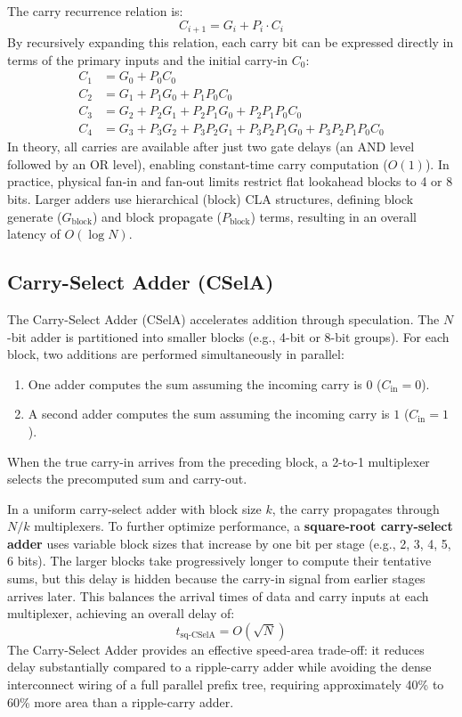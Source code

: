 The carry recurrence relation is:
\begin{equation}
C_{i+1} = G_i + P_i \cdot C_i
\end{equation}
By recursively expanding this relation, each carry bit can be expressed directly in terms of the primary inputs and the initial carry-in $C_0$:
\begin{align}
C_1 &= G_0 + P_0 C_0 \\
C_2 &= G_1 + P_1 G_0 + P_1 P_0 C_0 \\
C_3 &= G_2 + P_2 G_1 + P_2 P_1 G_0 + P_2 P_1 P_0 C_0 \\
C_4 &= G_3 + P_3 G_2 + P_3 P_2 G_1 + P_3 P_2 P_1 G_0 + P_3 P_2 P_1 P_0 C_0
\end{align}
In theory, all carries are available after just two gate delays (an AND level followed by an OR level), enabling constant-time carry computation ($O(1)$). In practice, physical fan-in and fan-out limits restrict flat lookahead blocks to 4 or 8 bits. Larger adders use hierarchical (block) CLA structures, defining block generate ($G_{\text{block}}$) and block propagate ($P_{\text{block}}$) terms, resulting in an overall latency of $O(\log N)$.

\subsection{Carry-Select Adder (CSelA)}
The Carry-Select Adder (CSelA) \cite{bedrij1962} accelerates addition through speculation. The $N$-bit adder is partitioned into smaller blocks (e.g., 4-bit or 8-bit groups). For each block, two additions are performed simultaneously in parallel:
\begin{enumerate}
    \item One adder computes the sum assuming the incoming carry is $0$ ($C_{\text{in}} = 0$).
    \item A second adder computes the sum assuming the incoming carry is $1$ ($C_{\text{in}} = 1$).
\end{enumerate}
When the true carry-in arrives from the preceding block, a 2-to-1 multiplexer selects the precomputed sum and carry-out. 

In a uniform carry-select adder with block size $k$, the carry propagates through $N/k$ multiplexers. To further optimize performance, a \textbf{square-root carry-select adder} uses variable block sizes that increase by one bit per stage (e.g., 2, 3, 4, 5, 6 bits). The larger blocks take progressively longer to compute their tentative sums, but this delay is hidden because the carry-in signal from earlier stages arrives later. This balances the arrival times of data and carry inputs at each multiplexer, achieving an overall delay of:
\begin{equation}
t_{\text{sq-CSelA}} = O(\sqrt{N})
\end{equation}
The Carry-Select Adder provides an effective speed-area trade-off: it reduces delay substantially compared to a ripple-carry adder while avoiding the dense interconnect wiring of a full parallel prefix tree, requiring approximately 40\% to 60\% more area than a ripple-carry adder.


